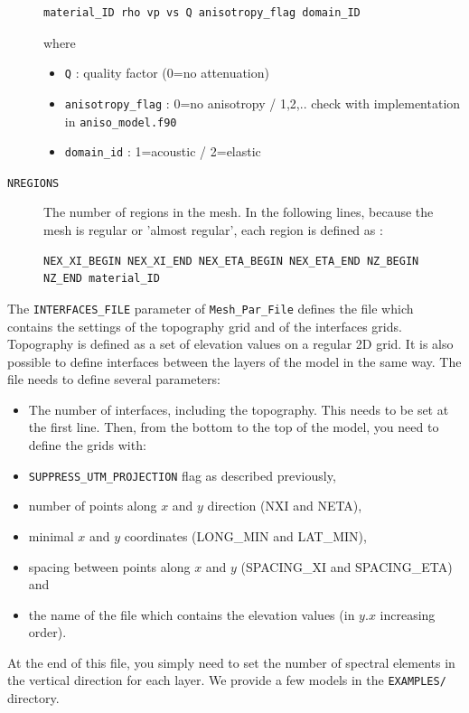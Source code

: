\begin{description}
\begin{verbatim}
material_ID rho vp vs Q anisotropy_flag domain_ID
\end{verbatim}

where
\begin{itemize}
\item \texttt{Q} : quality factor (0=no attenuation)
\item \texttt{anisotropy\_flag} : 0=no anisotropy / 1,2,.. check with implementation
in \texttt{aniso\_model.f90}
\item \texttt{domain\_id} : 1=acoustic / 2=elastic
\end{itemize}
\item [{\texttt{NREGIONS}}] The number of regions in the mesh. In the following
lines, because the mesh is regular or 'almost regular', each region
is defined as :

\begin{verbatim}
NEX_XI_BEGIN NEX_XI_END NEX_ETA_BEGIN NEX_ETA_END NZ_BEGIN NZ_END material_ID
\end{verbatim}
\end{description}
The \texttt{INTERFACES\_FILE} parameter of \texttt{Mesh\_Par\_File}
defines the file which contains the settings of the topography grid
and of the interfaces grids. Topography is defined as a set of elevation
values on a regular 2D grid. It is also possible to define interfaces
between the layers of the model in the same way. The file needs to
define several parameters:
\begin{itemize}
\item The number of interfaces, including the topography. This needs to
be set at the first line. Then, from the bottom to the top of the
model, you need to define the grids with:
\item \texttt{SUPPRESS\_UTM\_PROJECTION} flag as described previously,
\item number of points along $x$ and $y$ direction (NXI and NETA),
\item minimal $x$ and $y$ coordinates (LONG\_MIN and LAT\_MIN),
\item spacing between points along $x$ and $y$ (SPACING\_XI and SPACING\_ETA)
and
\item the name of the file which contains the elevation values (in $y$.$x$
increasing order).
\end{itemize}
At the end of this file, you simply need to set the number of spectral
elements in the vertical direction for each layer. We provide a few
models in the {\texttt{EXAMPLES/}} directory. \\


